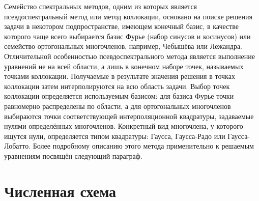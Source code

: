 \documentclass[12pt, a4paper]{report}
\begin{document}
Семейство спектральных методов, одним из которых является псевдоспектральный метод или метод коллокации, основано на поиске решения задачи в некотором подпространстве, имеющем конечный базис, в качестве которого чаще всего выбирается базис Фурье (набор синусов и косинусов) или семейство ортогональных многочленов, например, Чебышёва или Лежандра. 
Отличительной особенностью псевдоспектрального метода является выполнение уравнений не на всей области, а лишь в конечном наборе точек, называемых точками коллокации. Получаемые в результате значения решения в точках коллокации затем интерполируются на всю область задачи. 
Выбор точек коллокации определяется используемым базисом: для базиса Фурье точки равномерно распределены по области, а для ортогональных многочленов выбираются точки соответствующей интерполяционной квадратуры, задаваемые нулями определённых многочленов. Конкретный вид многочлена, у которого ищутся нули, определяется типом квадратуры: Гаусса, Гаусса-Радо или Гаусса-Лобатто. Более подробному описанию этого метода применительно к решаемым уравнениям посвящён следующий параграф.


\section{Численная схема}
\end{document}
